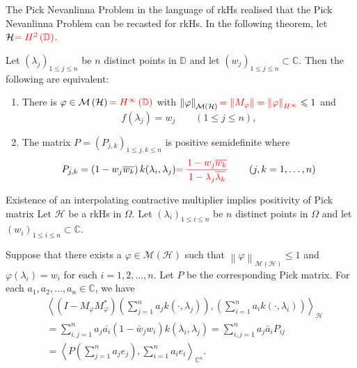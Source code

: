 \documentclass{beamer}
\newcommand{\C}{\mathbb C}
\newcommand{\D}{\mathbb D}
\renewcommand{\le}{\leqslant}
\newcommand{\calH}{{\mathcal H}}
\newcommand{\calM}{{\mathcal M}}
\newcommand{\ip}[1]{\left\langle #1 \right\rangle}
\newcommand{\norm}[1]{\left\lVert #1 \right\rVert}
\begin{document}
\begin{frame}{The Pick Nevanlinna Problem in the language of rkHs}
    \citeauthor{1cb1f5bb-aa4a-31e2-ba77-0159c6d327f4}  realised that the Pick Nevanlinna Problem can be recasted for rkHs. In the following theorem, let $\calH \textcolor{red}{= H^{2} \left( \D \right)}$.
\begin{theorem}
Let $\left( \lambda_{j} \right)_{1\le j \le n}$ be $n$ distinct points in $\D$ and let $\left( w_{j} \right)_{1 \le j \le n} \subset \C$. Then the following are equivalent:
\begin{enumerate}
\item There is $\varphi \in \calM \left( \calH \right) \textcolor{red}{= H^{\infty} \left( \D \right)}$ with $\norm{\varphi}_{\calM \left( \calH \right)} \textcolor{red}{=\norm{M_{\varphi}} = \norm{\varphi}_{H^{\infty}}}\le 1$ and 
\begin{equation*}
f\left( \lambda_{j} \right) = w_{j} \qquad \left( 1 \le j \le n \right),
\end{equation*}
\item The matrix $P = \left( P_{j,k} \right)_{1 \le j,k \le n}$ is positive semidefinite where
\begin{equation*}
P_{j,k} = \left( 1-w_{j}\overline{w_{k}} \right) k(\lambda_{i}, \lambda_{j})  \textcolor{red}{=\frac{1-w_{j} \overline{w_{k}}}{1-\lambda_{j}\overline{\lambda_{k}}}} \qquad \left( j,k = 1, \ldots , n \right)
\end{equation*}
\end{enumerate}
\end{theorem}
\end{frame}

\begin{frame}{Existence of an interpolating contractive multiplier implies positivity of Pick matrix}
Let $\calH$ be a rkHs in $\Omega$. Let $\left( \lambda_{i} \right)_{1\le i \le n}$ be $n$ distinct points in $\Omega$ and let $\left( w_{i} \right)_{1 \le i \le n} \subset \C$.

Suppose that there exists a $\varphi \in \calM \left( \calH \right)$ such that $\norm{\varphi}_{\calM \left( \calH \right)} \le 1$ and $\varphi \left( \lambda_{i} \right) = w_{i}$ for each $i=1,2, \ldots , n$. Let $P$ be the corresponding Pick matrix. \pause For each $a_{1}, a_{2}, \ldots , a_{n} \in \C$, we have
\begin{align*}
& \ip{\left( I-M_{\varphi} M_{\varphi} ^{*} \right) \left( \sum_{j=1}^{n} a_{j} k\left( \cdot , \lambda_{j} \right) \right),  \left( \sum_{i=1}^{n} a_{i} k\left( \cdot , \lambda_{i} \right) \right)}_{\calH} \\ &= \sum_{i,j=1}^{n} a_{j}\bar{a_{i}} \left( 1-\bar w_{j} w_{i} \right) k\left( \lambda_{i}, \lambda_{j} \right) = \sum_{i,j=1}^{n} a_{j} \bar a_{i} P_{ij} \\ &= \ip{P\left( \sum_{j=1}^{n} a_{j} e_{j} \right) , \sum_{i=1}^{n} a_{i} e_{i}}_{\C ^{n}}.
\end{align*}
\end{frame}
\end{document}
